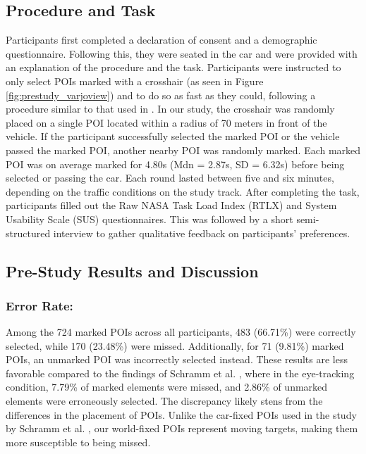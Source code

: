 \subsection{Procedure and Task}
\label{sec:prestudy_procedure}
Participants first completed a declaration of consent and a demographic questionnaire. Following this, they were seated in the car and were provided with an explanation of the procedure and the task. Participants were instructed to only select POIs marked with a crosshair (as seen in Figure \ref{fig:prestudy_varjoview}) and to do so as fast as they could, following a procedure similar to that used in \cite{Schramm2023Assessing}. In our study, the crosshair was randomly placed on a single POI located within a radius of 70 meters in front of the vehicle. If the participant successfully selected the marked POI or the vehicle passed the marked POI, another nearby POI was randomly marked. Each marked POI was on average marked for 4.80s (Mdn = 2.87s, SD = 6.32s) before being selected or passing the car. Each round lasted between five and six minutes, depending on the traffic conditions on the study track. After completing the task, participants filled out the Raw NASA Task Load Index (RTLX) \cite{hart1988development, hart2006nasa} and System Usability Scale (SUS) \cite{Brooke96SUS} questionnaires. This was followed by a short semi-structured interview to gather qualitative feedback on participants' preferences.

\subsection{Pre-Study Results and Discussion}
\label{sec:prestudy_results}
\subsubsection*{\textbf{Error Rate:}} Among the 724 marked POIs across all participants, 483 (66.71\%) were correctly selected, while 170 (23.48\%) were missed.  Additionally, for 71 (9.81\%) marked POIs, an unmarked POI was incorrectly selected instead. These results are less favorable compared to the findings of Schramm et al. \cite{Schramm2023Assessing}, where in the eye-tracking condition, 7.79\% of marked elements were missed, and 2.86\% of unmarked elements were erroneously selected. The discrepancy likely stens from the differences in the placement of POIs. Unlike the car-fixed POIs used in the study by Schramm et al. \cite{Schramm2023Assessing}, our world-fixed POIs represent moving targets, making them more susceptible to being missed.

